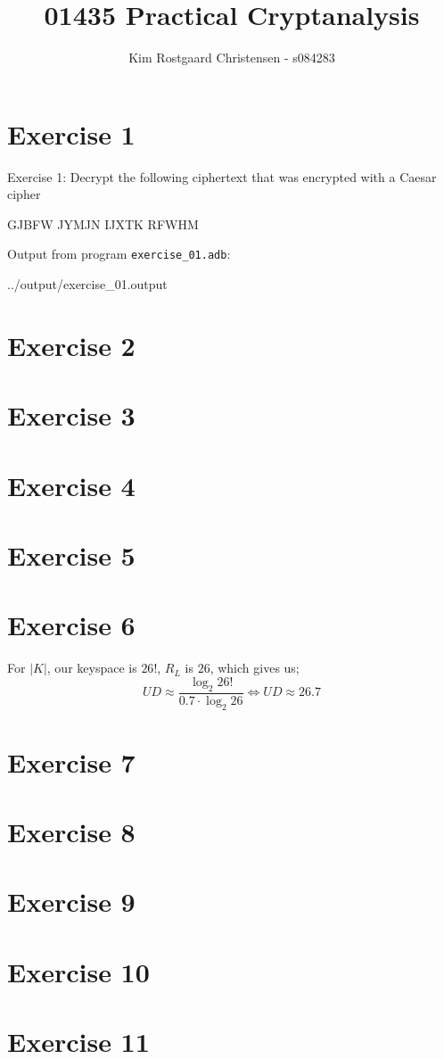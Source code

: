 \documentclass[10pt,a4paper]{article}
\title{01435 Practical Cryptanalysis}
\author{Kim Rostgaard Christensen - s084283}
\def\Code#1{\texttt{#1}}
\begin{document}
\maketitle

\section*{Exercise 1}
Exercise 1: Decrypt the following ciphertext that was encrypted with a Caesar cipher\\

\begin{center}
GJBFW JYMJN IJXTK RFWHM
\end{center}
Output from program \Code{exercise\_01.adb}:

 {../output/exercise_01.output}

\section*{Exercise 2}
\section*{Exercise 3}
\section*{Exercise 4}
\section*{Exercise 5}

\section*{Exercise 6}
For $|K|$, our keyspace is $26!$, $R_L$ is $26$, which gives us;
\begin{equation}
UD \approx \frac{\log_2{26!}}{0.7 \cdot \log_2{26}} \Leftrightarrow UD \approx 26.7
\end{equation}

\section*{Exercise 7}
\section*{Exercise 8}
\section*{Exercise 9}
\section*{Exercise 10}
\section*{Exercise 11}
\end{document}
